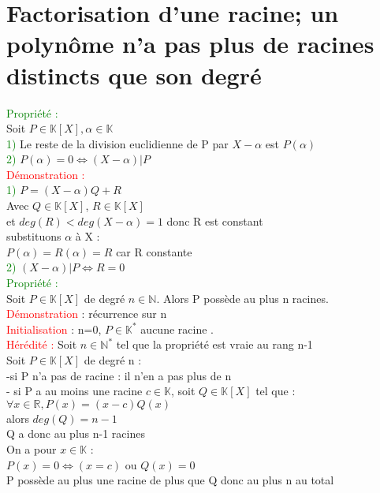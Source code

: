 \documentclass{article}
\begin{document}
\section{Factorisation d'une racine; un polynôme n'a pas plus de racines distincts que son degré}
\textcolor{green}{Propriété :} \\
Soit $P \in \mathbb{K}[X], \alpha \in \mathbb K$ \\
\textcolor{green}{1)} Le reste de la division euclidienne de P par $X-\alpha$ est $P(\alpha)$ \\
\textcolor{green}{2)} $P(\alpha)= 0 \Longleftrightarrow (X- \alpha)|P$ \\
\textcolor{red}{Démonstration :} \\
\textcolor{green}{1)} $P=(X-\alpha)Q + R$ \\
Avec $Q \in \mathbb K [X]$, $R \in \mathbb K [X]$ \\
et $deg(R)< deg(X- \alpha) = 1$ donc R est constant \\
substituons $\alpha$ à X : \\
$P(\alpha)=R(\alpha)=R$ car R constante \\
\textcolor{green}{2)} $(X- \alpha)|P \Longleftrightarrow R=0$ \\
\textcolor{green}{Propriété :} \\
	Soit $P \in \mathbb{K}[X]$ de degré $n \in \mathbb{N}$. Alors P possède au plus n racines. \\
	\textcolor{red}{Démonstration} : récurrence sur n \\
	\textcolor{red}{Initialisation} : n=0, $P \in \mathbb{K}^*$ aucune racine . \\
	\textcolor{red}{Hérédité :} Soit $ n \in \mathbb{N}^*$ tel que la propriété est vraie au rang n-1 \\
	Soit $ P \in \mathbb{K}[X]$ de degré n : \\
	-si P n'a pas de racine : il n'en a pas plus de n\\
	- si P a au moins une racine $c \in \mathbb{K}$,
		soit $Q \in \mathbb{K}[X]$ tel que : \\
		$\forall x \in \mathbb{R}, P(x)=(x-c)Q(x)$ \\
		alors $deg(Q)=n-1$ \\
			Q a donc au plus n-1 racines \\
			On a pour $x \in \mathbb{K}$ : \\
				$P(x)=0 \Leftrightarrow (x=c)$ ou $Q(x)=0$ \\
			P possède au plus une racine de plus que Q donc au plus n au total
\end{document}

